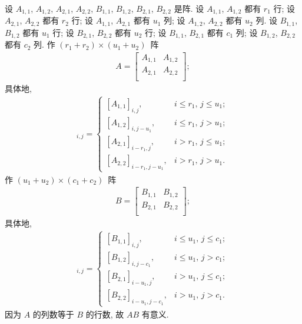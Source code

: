 \begin{theorem}
    设
    \(A_{1,1}\), \(A_{1,2}\), \(A_{2,1}\), \(A_{2,2}\),
    \(B_{1,1}\), \(B_{1,2}\), \(B_{2,1}\), \(B_{2,2}\)
    是阵.
    设 \(A_{1,1}\), \(A_{1,2}\) 都有 \(r_1\) 行;
    设 \(A_{2,1}\), \(A_{2,2}\) 都有 \(r_2\) 行;
    设 \(A_{1,1}\), \(A_{2,1}\) 都有 \(u_1\) 列;
    设 \(A_{1,2}\), \(A_{2,2}\) 都有 \(u_2\) 列.
    设 \(B_{1,1}\), \(B_{1,2}\) 都有 \(u_1\) 行;
    设 \(B_{2,1}\), \(B_{2,2}\) 都有 \(u_2\) 行;
    设 \(B_{1,1}\), \(B_{2,1}\) 都有 \(c_1\) 列;
    设 \(B_{1,2}\), \(B_{2,2}\) 都有 \(c_2\) 列.
    作 \((r_1 + r_2) \times (u_1 + u_2)\)~阵
    \begin{align*}
        A = \begin{bmatrix}
                A_{1,1} & A_{1,2} \\
                A_{2,1} & A_{2,2} \\
            \end{bmatrix};
    \end{align*}
    具体地,
    \begin{align*}
        [A]_{i,j}
        = \begin{cases}
              [A_{1,1}]_{i,j},
               & \text{\(i \leq r_1\), \(j \leq u_1\)}; \\
              [A_{1,2}]_{i,j-u_1},
               & \text{\(i \leq r_1\), \(j > u_1\)};    \\
              [A_{2,1}]_{i-r_1,j},
               & \text{\(i > r_1\), \(j \leq u_1\)};    \\
              [A_{2,2}]_{i-r_1,j-u_1},
               & \text{\(i > r_1\), \(j > u_1\)}.
          \end{cases}
    \end{align*}
    作 \((u_1 + u_2) \times (c_1 + c_2)\)~阵
    \begin{align*}
        B = \begin{bmatrix}
                B_{1,1} & B_{1,2} \\
                B_{2,1} & B_{2,2} \\
            \end{bmatrix};
    \end{align*}
    具体地,
    \begin{align*}
        [B]_{i,j}
        = \begin{cases}
              [B_{1,1}]_{i,j},
               & \text{\(i \leq u_1\), \(j \leq c_1\)}; \\
              [B_{1,2}]_{i,j-c_1},
               & \text{\(i \leq u_1\), \(j > c_1\)};    \\
              [B_{2,1}]_{i-u_1,j},
               & \text{\(i > u_1\), \(j \leq c_1\)};    \\
              [B_{2,2}]_{i-u_1,j-c_1},
               & \text{\(i > u_1\), \(j > c_1\)}.
          \end{cases}
    \end{align*}
    因为 \(A\) 的列数等于 \(B\) 的行数,
    故 \(AB\) 有意义.


\end{theorem}

